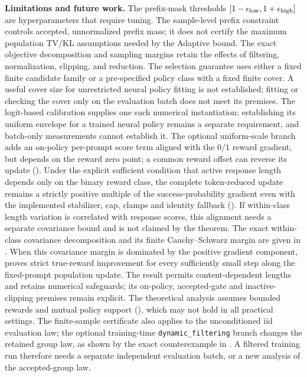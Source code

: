 \textbf{Limitations and future work.} The prefix-mask thresholds $[1-\epsilon_{\mathrm{low}}, 1+\epsilon_{\mathrm{high}}]$ are hyperparameters that require tuning. The
sample-level prefix constraint controls accepted, unnormalized prefix mass;
it does not certify the maximum population TV/KL assumptions needed by the
Adaptive bound. The exact objective decomposition and sampling margins
retain the effects of filtering, normalization, clipping, and reduction.
The selection guarantee uses either a fixed finite candidate family or a
pre-specified policy class with a fixed finite cover. A useful cover size
for unrestricted neural policy fitting is not established; fitting or
checking the cover only on the evaluation batch does not meet its premises.
The logit-based calibration supplies one such numerical instantiation;
establishing its uniform envelope for a trained neural policy remains a
separate requirement, and batch-only measurements cannot establish it.
The optional uniform-scale branch adds an on-policy per-prompt score term
aligned with the $0/1$ reward gradient, but depends on the reward zero
point; a common reward offset can reverse its update
().
Under the explicit sufficient condition that active response length depends
only on the binary reward class, the complete token-reduced update remains a
strictly positive multiple of the success-probability gradient even with the
implemented stabilizer, cap, clamps and identity fallback
(). If within-class length variation is
correlated with response scores, this alignment needs a separate covariance
bound and is not claimed by the theorem. The exact within-class covariance
decomposition and its finite Cauchy--Schwarz margin are given in
.
When this covariance margin is dominated by the positive gradient component,
 proves strict true-reward improvement
for every sufficiently small step along the fixed-prompt population update.
The result permits content-dependent lengths and retains numerical
safeguards; its on-policy, accepted-gate and inactive-clipping premises
remain explicit.
The theoretical analysis assumes bounded rewards and mutual policy support (), which may not
hold in all practical settings. The finite-sample certificate also applies to the unconditioned iid evaluation law; the optional
training-time \texttt{dynamic\_filtering} branch changes the retained group law, as shown by the exact counterexample in .
A filtered training run therefore needs a separate independent evaluation batch, or a new analysis of the accepted-group law.
